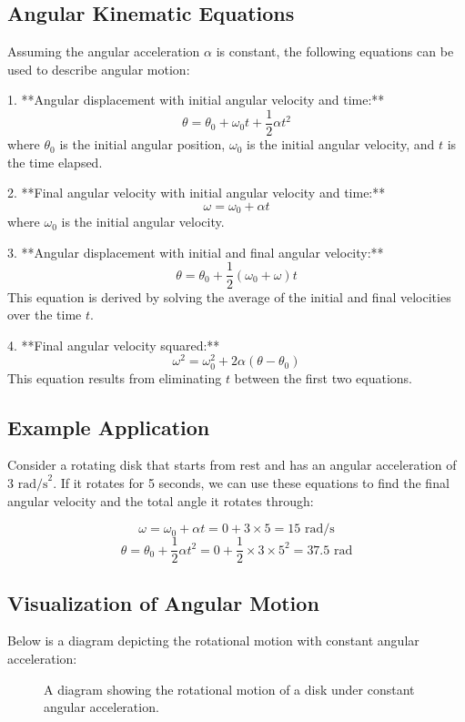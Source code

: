 \documentclass[12pt]{article}
\begin{document}
\subsection{Angular Kinematic Equations}
Assuming the angular acceleration \(\alpha\) is constant, the following equations can be used to describe angular motion:

1. **Angular displacement with initial angular velocity and time:**
\[
\theta = \theta_0 + \omega_0 t + \frac{1}{2} \alpha t^2
\]
where \(\theta_0\) is the initial angular position, \(\omega_0\) is the initial angular velocity, and \(t\) is the time elapsed.

2. **Final angular velocity with initial angular velocity and time:**
\[
\omega = \omega_0 + \alpha t
\]
where \(\omega_0\) is the initial angular velocity.

3. **Angular displacement with initial and final angular velocity:**
\[
\theta = \theta_0 + \frac{1}{2}(\omega_0 + \omega) t
\]
This equation is derived by solving the average of the initial and final velocities over the time \(t\).

4. **Final angular velocity squared:**
\[
\omega^2 = \omega_0^2 + 2\alpha(\theta - \theta_0)
\]
This equation results from eliminating \(t\) between the first two equations.

\subsection{Example Application}
Consider a rotating disk that starts from rest and has an angular acceleration of \(3 \text{ rad/s}^2\). If it rotates for 5 seconds, we can use these equations to find the final angular velocity and the total angle it rotates through:

\[
\omega = \omega_0 + \alpha t = 0 + 3 \times 5 = 15 \text{ rad/s}
\]
\[
\theta = \theta_0 + \frac{1}{2} \alpha t^2 = 0 + \frac{1}{2} \times 3 \times 5^2 = 37.5 \text{ rad}
\]

\subsection{Visualization of Angular Motion}
Below is a diagram depicting the rotational motion with constant angular acceleration:

\begin{figure}[h]
\centering
{}
\caption{A diagram showing the rotational motion of a disk under constant angular acceleration.}
\end{figure}
\end{document}
